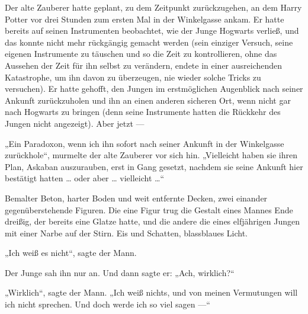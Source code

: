 Der alte Zauberer hatte geplant, zu dem Zeitpunkt zurückzugehen, an dem Harry Potter vor drei Stunden zum ersten Mal in der Winkelgasse ankam. Er hatte bereits auf seinen Instrumenten beobachtet, wie der Junge Hogwarts verließ, und das konnte nicht mehr rückgängig gemacht werden (sein einziger Versuch, seine eigenen Instrumente zu täuschen und so die Zeit zu kontrollieren, ohne das Aussehen der Zeit für ihn selbst zu verändern, endete in einer ausreichenden Katastrophe, um ihn davon zu überzeugen, nie wieder solche Tricks zu versuchen). Er hatte gehofft, den Jungen im erstmöglichen Augenblick nach seiner Ankunft zurückzuholen und ihn an einen anderen sicheren Ort, wenn nicht gar nach Hogwarts zu bringen (denn seine Instrumente hatten die Rückkehr des Jungen nicht angezeigt). Aber jetzt —

„Ein Paradoxon, wenn ich ihn sofort nach seiner Ankunft in der Winkelgasse zurückhole“, murmelte der alte Zauberer vor sich hin.
„Vielleicht haben sie ihren Plan, Askaban auszurauben, erst in Gang gesetzt, nachdem sie seine Ankunft hier bestätigt hatten … oder aber … vielleicht …“

\later

Bemalter Beton, harter Boden und weit entfernte Decken, zwei einander gegenüberstehende Figuren. Die eine Figur trug die Gestalt eines Mannes Ende dreißig, der bereits eine Glatze hatte, und die andere die eines elfjährigen Jungen mit einer Narbe auf der Stirn. Eis und Schatten, blassblaues Licht.

„Ich weiß es nicht“, sagte der Mann.

Der Junge sah ihn nur an. Und dann sagte er:
„Ach, wirklich?“

„Wirklich“, sagte der Mann.
„Ich weiß nichts, und von meinen Vermutungen will ich nicht sprechen. Und doch werde ich so viel sagen —“

